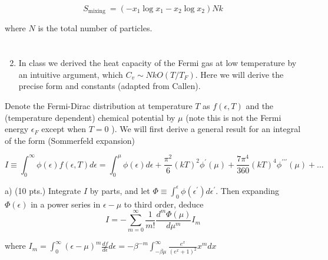 \documentclass[12pt]{article}
\begin{document}
$$
S_{\text {mixing }}=\left(-x_{1} \log x_{1}-x_{2} \log x_{2}\right) N k
$$

where $N$ is the total number of particles.
\section{}
\begin{enumerate}
  \setcounter{enumi}{1}
  \item In class we derived the heat capacity of the Fermi gas at low temperature by an intuitive argument, which $C_{v} \sim N k O\left(T / T_{F}\right)$. Here we will derive the precise form and constants (adapted from Callen).
\end{enumerate}

Denote the Fermi-Dirac distribution at temperature $T$ as $f(\epsilon, T)$ and the (temperature dependent) chemical potential by $\mu$ (note this is not the Fermi energy $\epsilon_{F}$ except when $T=0$ ). We will first derive a general result for an integral of the form (Sommerfeld expansion)

$$
I \equiv \int_{0}^{\infty} \phi(\epsilon) f(\epsilon, T) d \epsilon=\int_{0}^{\mu} \phi(\epsilon) d \epsilon+\frac{\pi^{2}}{6}(k T)^{2} \phi^{\prime}(\mu)+\frac{7 \pi^{4}}{360}(k T)^{4} \phi^{\prime \prime \prime}(\mu)+\ldots
$$

a) (10 pts.) Integrate $I$ by parts, and let $\Phi \equiv \int_{0}^{\epsilon} \phi\left(\epsilon^{\prime}\right) d \epsilon^{\prime}$. Then expanding $\Phi(\epsilon)$ in a power series in $\epsilon-\mu$ to third order, deduce
$$
I=-\sum_{m=0}^{\infty} \frac{1}{m !} \frac{d^{m} \Phi(\mu)}{d \mu^{m}} I_{m}
$$

where $I_{m}=\int_{0}^{\infty}(\epsilon-\mu)^{m} \frac{d f}{d \epsilon} d \epsilon=-\beta^{-m} \int_{-\beta \mu}^{\infty} \frac{e^{x}}{\left(e^{x}+1\right)^{2}} x^{m} d x$
\end{document}
